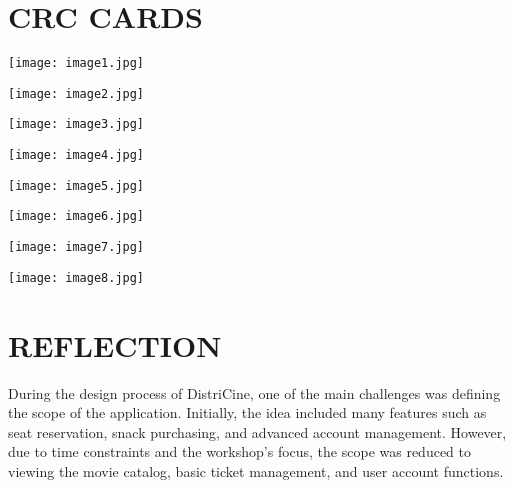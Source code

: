 \documentclass[12pt, letterpaper]{article}
\begin{document}
\section{CRC CARDS}
\begin{center}
\begin{minipage}{0.3\textwidth}
\texttt{[image: image1.jpg]}
\end{minipage}
\begin{minipage}{0.3\textwidth}
\texttt{[image: image2.jpg]}
\end{minipage}
\begin{minipage}{0.3\textwidth}
\texttt{[image: image3.jpg]}
\end{minipage}

\vspace{1em}

\begin{minipage}{0.3\textwidth}
\texttt{[image: image4.jpg]}
\end{minipage}
\begin{minipage}{0.3\textwidth}
\texttt{[image: image5.jpg]}
\end{minipage}
\begin{minipage}{0.3\textwidth}
\texttt{[image: image6.jpg]}
\end{minipage}

\vspace{1em}

\begin{minipage}{0.3\textwidth}
\texttt{[image: image7.jpg]}
\end{minipage}
\begin{minipage}{0.3\textwidth}
\texttt{[image: image8.jpg]}
\end{minipage}
\end{center}


\section{REFLECTION}

During the design process of DistriCine, one of the main challenges was defining the scope of the application. Initially, the idea included many features such as seat reservation, snack purchasing, and advanced account management. However, due to time constraints and the workshop’s focus, the scope was reduced to viewing the movie catalog, basic ticket management, and user account functions.
\end{document}
